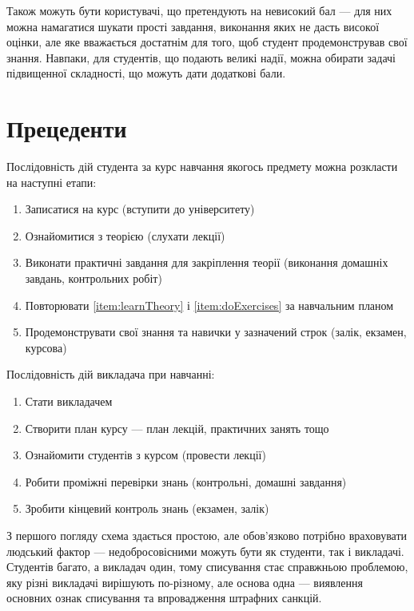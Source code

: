 Також можуть бути користувачі, що претендують на невисокий бал --- для них
можна намагатися шукати прості завдання, виконання яких не дасть високої
оцінки, але яке вважається достатнім для того, щоб студент продемонстрував свої
знання. Навпаки, для студентів, що подають великі надії, можна обирати
задачі підвищенної складності, що можуть дати додаткові бали.

\section{Прецеденти}


Послідовність дій студента за курс навчання якогось предмету можна розкласти
на наступні етапи:
\begin{enumerate}
    \item
        Записатися на курс (вступити до університету)
    \item\label{item:learnTheory}
        Ознайомитися з теорією (слухати лекції)
    \item\label{item:doExercises}
        Виконати практичні завдання для закріплення теорії
        (виконання домашніх завдань, контрольних робіт)
    \item
        Повторювати \ref{item:learnTheory} і \ref{item:doExercises} за
        навчальним планом
    \item
        Продемонструвати свої знання та навички у зазначений строк
        (залік, екзамен, курсова)
\end{enumerate}

Послідовність дій викладача при навчанні:
\begin{enumerate}
    \item
        Стати викладачем
    \item
        Створити план курсу --- план лекцій, практичних занять тощо
    \item
        Ознайомити студентів з курсом (провести лекції)
    \item
        Робити проміжні перевірки знань (контрольні, домашні завдання)
    \item
        Зробити кінцевий контроль знань (екзамен, залік)
\end{enumerate}

З першого погляду схема здається простою, але обов’язково потрібно враховувати
людський фактор --- недобросовісними можуть бути як студенти, так і викладачі.
Студентів багато, а викладач один, тому списування стає справжньою проблемою,
яку різні викладачі вирішують по-різному, але основа одна --- виявлення
основних ознак списування та впровадження штрафних санкцій.

